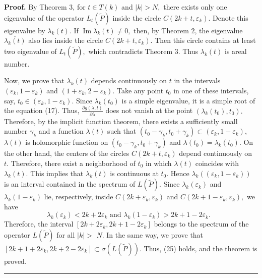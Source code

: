 \documentclass{article}%
\newenvironment{proof}[1][Proof]{\textbf{#1.} }{\ \rule{0.5em}{0.5em}}
\begin{document}
\begin{proof}
By Theorem 3, for $t\in T(k)$ and $\left\vert k\right\vert >N,$ there exists
only one eigenvalue of the operator $L_{t}\left(  \widetilde{P}\right)  $
inside the circle $C(2k+t,\varepsilon_{k}).$ Denote this eigenvalue by
$\lambda_{k}(t).$ If $\operatorname{Im}\lambda_{k}(t)\neq0,$ then, by Theorem
2, the eigenvalue $\overline{\lambda_{k}(t)}$ also lies inside the circle
$C(2k+t,\varepsilon_{k}).$ Then this circle contains at least two eigenvalue
of $L_{t}\left(  \widetilde{P}\right)  ,$ which contradicts Theorem 3. Thus
$\lambda_{k}(t)$ is areal number.

Now, we prove that $\lambda_{k}(t)$ depends continuously on $t$ in the
intervals $(\varepsilon_{k},1-\varepsilon_{k})$ and $(1+\varepsilon
_{k},2-\varepsilon_{k}).$ Take any point $t_{0}$ in one of these intervals,
say, $t_{0}\in(\varepsilon_{k},1-\varepsilon_{k}).$ Since $\lambda_{k}(t_{0})$
is a simple eigenvalue, it is a simple root of the equation (17). Thus,
$\frac{\partial g(\lambda,t)}{\partial\lambda}$ does not vanish at the point
$\left(  \lambda_{k}(t_{0}),t_{0}\right)  .$ Therefore, by the implicit
function theorem, there exists a sufficiently small number $\gamma_{k}$ and a
function $\lambda(t)$ such that $\left(  t_{0}-\gamma_{k},t_{0}+\gamma
_{k}\right)  \subset(\varepsilon_{k},1-\varepsilon_{k}),$ $\lambda(t)$ is
holomorphic function on $\left(  t_{0}-\gamma_{k},t_{0}+\gamma_{k}\right)  $
and $\lambda(t_{0})=\lambda_{k}(t_{0}).$ On the other hand, the centers of the
circles $C(2k+t,\varepsilon_{k})$ depend continuously on $t.$ Therefore, there
exist a neighborhood of $t_{0}$ in which $\lambda(t)$ coincides with
$\lambda_{k}(t)$. This implies that $\lambda_{k}(t)$ is continuous at $t_{0}.$
Hence $\lambda_{k}((\varepsilon_{k},1-\varepsilon_{k}))$ is an interval
contained in the spectrum of $L\left(  \widetilde{P}\right)  $. Since
$\lambda_{k}(\varepsilon_{k})$ and $\lambda_{k}(1-\varepsilon_{k})$ lie,
respectively, inside $C(2k+\varepsilon_{k},\varepsilon_{k})$ and
$C(2k+1-\varepsilon_{k},\varepsilon_{k}),$ we have
\[
\lambda_{k}(\varepsilon_{k})<2k+2\varepsilon_{k}\text{ and }\lambda
_{k}(1-\varepsilon_{k})>2k+1-2\varepsilon_{k}.\text{ }%
\]
Therefore, the interval $[2k+2\varepsilon_{k},2k+1-2\varepsilon_{k}]$ belongs
to the spectrum of the operator $L\left(  \widetilde{P}\right)  $ for all
$\left\vert k\right\vert >$ $N$. In the same way, we prove that
$[2k+1+2\varepsilon_{k},2k+2-2\varepsilon_{k}]\subset\sigma(L\left(
\widetilde{P}\right)  ).$ Thus, (25) holds, and the theorem is proved.
\end{proof}
\end{document}
